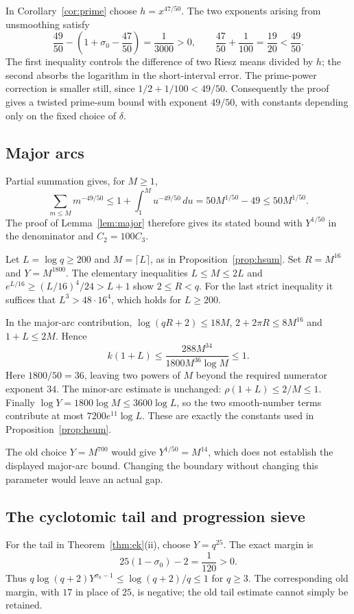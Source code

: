 \documentclass[screen,reqno]{aomart}
\numberwithin{equation}{section}
\theoremstyle{definition}
\begin{document}
In Corollary~\ref{cor:prime} choose $h=x^{47/50}$. The two exponents
arising from unsmoothing satisfy
\[
 \frac{49}{50}-\left(1+\sigma_0-\frac{47}{50}\right)
 =\frac1{3000}>0,\qquad
 \frac{47}{50}+\frac1{100}=\frac{19}{20}<\frac{49}{50}.
\]
The first inequality controls the difference of two Riesz means divided
by $h$; the second absorbs the logarithm in the short-interval error.
The prime-power correction is smaller still, since
$1/2+1/100<49/50$. Consequently the proof gives a twisted prime-sum
bound with exponent $49/50$, with constants depending only on the fixed
choice of $\delta$.

\subsection{Major arcs}
Partial summation gives, for $M\ge1$,
\[
 \sum_{m\le M}m^{-49/50}
 \le1+\int_1^M u^{-49/50}\,du
 =50M^{1/50}-49\le50M^{1/50}.
\]
The proof of Lemma~\ref{lem:major} therefore gives its stated bound
with $Y^{1/50}$ in the denominator and $C_2=100C_3$.

Let $L=\log q\ge200$ and $M=\lceil L\rceil$, as in
Proposition~\ref{prop:hsum}. Set $R=M^{16}$ and $Y=M^{1800}$.
The elementary inequalities $L\le M\le2L$ and
$e^{L/16}\ge(L/16)^4/24>L+1$ show $2\le R<q$.
For the last strict inequality it suffices that
$L^3>48\cdot16^4$, which holds for $L\ge200$.

In the major-arc contribution, $\log(qR+2)\le18M$,
$2+2\pi R\le8M^{16}$ and $1+L\le2M$. Hence
\[
 k(1+L)
 \le\frac{288M^{34}}{1800M^{36}\log M}\le1.
\]
Here $1800/50=36$, leaving two powers of $M$ beyond the required
numerator exponent $34$. The minor-arc estimate is unchanged:
$\rho(1+L)\le2/M\le1$. Finally
$\log Y=1800\log M\le3600\log L$, so the two smooth-number terms
contribute at most $7200e^{11}\log L$. These are exactly the constants
used in Proposition~\ref{prop:hsum}.

The old choice $Y=M^{700}$ would give $Y^{1/50}=M^{14}$, which does
not establish the displayed major-arc bound. Changing the boundary
without changing this parameter would leave an actual gap.

\subsection{The cyclotomic tail and progression sieve}
For the tail in Theorem~\ref{thm:ek}(ii), choose $Y=q^{25}$. The exact
margin is
\[
 25(1-\sigma_0)-2=\frac1{120}>0.
\]
Thus $q\log(q+2)Y^{\sigma_0-1}\le\log(q+2)/q\le1$ for $q\ge3$.
The corresponding old margin, with $17$ in place of $25$, is negative;
the old tail estimate cannot simply be retained.
\end{document}
